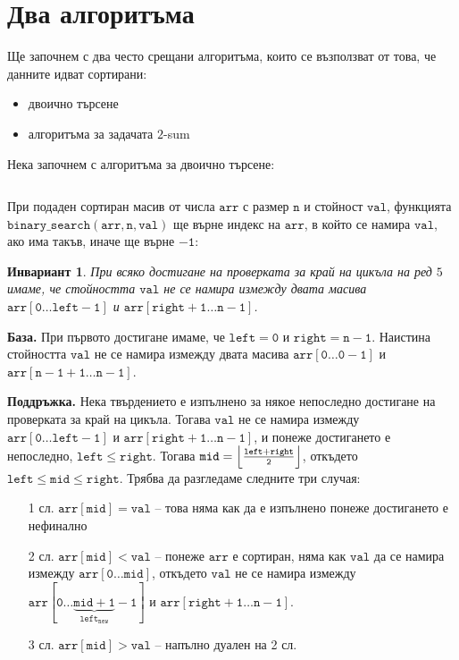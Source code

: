 \documentclass{article}
\theoremstyle{definition}
\theoremstyle{plain}
\newtheorem*{invariant}{Инвариант}
\theoremstyle{remark}
\theoremstyle{definition}
\begin{document}
\section*{Два алгоритъма}

Ще започнем с два често срещани алгоритъма, които се възползват от това, че данните идват сортирани:
\begin{itemize}
    \item двоично търсене
    \item алгоритъма за задачата $2$-sum
\end{itemize}

Нека започнем с алгоритъма за двоично търсене:
\inputminted[linenos]{c++}{algorithms/binary_search.cpp}

При подаден сортиран масив от числа $\mathtt{arr}$ с размер $\mathtt{n}$ и стойност $\mathtt{val}$, функцията $\mathtt{binary\_search(arr, n, val)}$ ще върне индекс на $\mathtt{arr}$, в който се намира $\mathtt{val}$, ако има такъв, иначе ще върне $\mathtt{-1}$:
\begin{invariant}
    При всяко достигане на проверката за край на цикъла на ред $5$ имаме, че стойността $\mathtt{val}$ не се намира измежду двата масива $\mathtt{arr[0 \dots left - 1]}$ и $\mathtt{arr[right + 1 \dots n - 1]}$.
\end{invariant}

\textbf{База.}
При първото достигане имаме, че $\mathtt{left = 0}$ и $\mathtt{right = n - 1}$.
Наистина стойността $\mathtt{val}$ не се намира измежду двата масива $\mathtt{arr[0 \dots 0 -1]}$ и $\mathtt{arr[n - 1 + 1 \dots n - 1]}$.

\textbf{Поддръжка.}
Нека твърдението е изпълнено за някое непоследно достигане на проверката за край на цикъла.
Тогава $\mathtt{val}$ не се намира измежду $\mathtt{arr[0 \dots left - 1]}$ и $\mathtt{arr[right + 1 \dots n - 1]}$, и понеже достигането е непоследно, $\mathtt{left \leq right}$.
Тогава $\mathtt{mid = \Bigl\lfloor \frac{left + right}{2} \Bigr\rfloor}$, откъдето $\mathtt{left \leq mid \leq right}$.
Трябва да разгледаме следните три случая:
\begin{itemize}
    \item[1 сл.] $\mathtt{arr[mid] = val}$ -- това няма как да е изпълнено понеже достигането е нефинално
    \item[2 сл.] $\mathtt{arr[mid] < val}$ -- понеже $\mathtt{arr}$ е сортиран, няма как $\mathtt{val}$ да се намира измежду $\mathtt{arr[0 \dots mid]}$, откъдето $\mathtt{val}$ не се намира измежду $\mathtt{arr[0 \dots \underbrace{\mathtt{mid + 1}}_{left_{new}} - 1]}$ и $\mathtt{arr[right + 1 \dots n - 1]}$.
    \item[3 сл.] $\mathtt{arr[mid] > val}$ -- напълно дуален на 2 сл.
\end{itemize}
\end{document}
